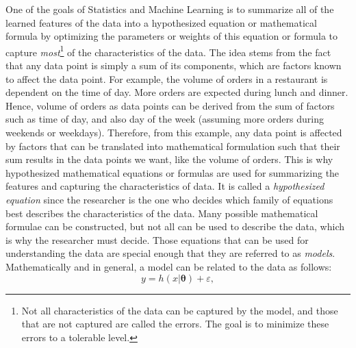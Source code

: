 One of the goals of Statistics and Machine Learning is to summarize all of the learned features of the data into a hypothesized equation or mathematical formula by optimizing the parameters or weights of this equation or formula to capture \textit{most}\footnote{Not all characteristics of the data can be captured by the model, and those that are not captured are called the errors. The goal is to minimize these errors to a tolerable level.} of the characteristics of the data. The idea stems from the fact that any data point is simply a sum of its components, which are factors known to affect the data point. For example, the volume of orders in a restaurant is dependent on the time of day. More orders are expected during lunch and dinner. Hence, volume of orders as data points can be derived from the sum of factors such as time of day, and also day of the week (assuming more orders during weekends or weekdays). Therefore, from this example, any data point is affected by factors that can be translated into mathematical formulation such that their sum results in the data points we want, like the volume of orders. This is why hypothesized mathematical equations or formulas are used for summarizing the features and capturing the characteristics of data. It is called a \textit{hypothesized equation} since the researcher is the one who decides which family of equations best describes the characteristics of the data. Many possible mathematical formulae can be constructed, but not all can be used to describe the data, which is why the researcher must decide. Those equations that can be used for understanding the data are special enough that they are referred to as \textit{models}. Mathematically and in general, a model can be related to the data as follows:
\begin{equation}\label{eq:general_model}
    y=h(x|\boldsymbol{\theta})+\varepsilon,
\end{equation}
